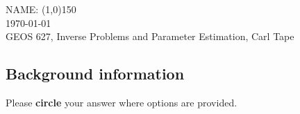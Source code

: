 \documentclass[11pt,titlepage,fleqn]{article}
\begin{document}

\noindent NAME: \line(1,0){150} \\
\noindent \today \\
\noindent GEOS 627, Inverse Problems and Parameter Estimation, Carl Tape

\noindent

\subsection*{Background information}

Please {\bf circle} your answer where options are provided.
\end{document}
